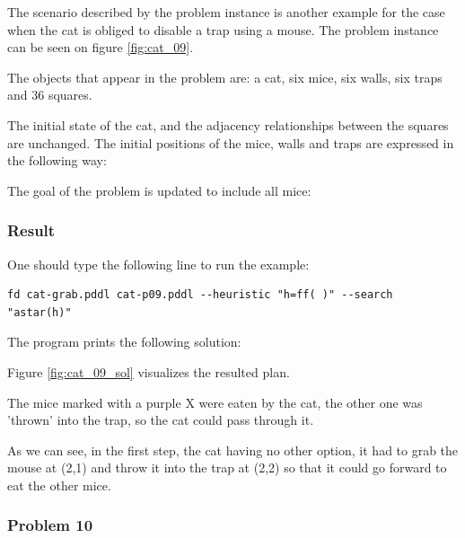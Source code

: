 The scenario described by the problem instance is another example for the case when the cat is obliged to disable a trap using a mouse. The problem instance can be seen on figure \ref{fig:cat_09}. 

The objects that appear in the problem are: a cat, six mice, six walls, six traps and 36 squares.



The initial state of the cat, and the adjacency relationships between the squares are unchanged. The initial positions of the mice, walls and traps are expressed in the following way:

 

 
The goal of the problem is updated to include all mice:

 


\subsubsection{Result}

One should type the following line to run the example: 

\begin{lstlisting}[numbers=none]
fd cat-grab.pddl cat-p09.pddl --heuristic "h=ff( )" --search "astar(h)"
\end{lstlisting}

The program prints the following solution:



Figure \ref{fig:cat_09_sol} visualizes the resulted plan. 

The mice marked with a purple X were eaten by the cat, the other one was 'thrown' into the trap, so the cat could pass through it.

As we can see, in the first step, the cat having no other option, it had to grab the mouse at (2,1) and throw it into the trap at (2,2) so that it could go forward to eat the other mice.



\subsubsection{Problem 10}
\label{sec:prob_10}

